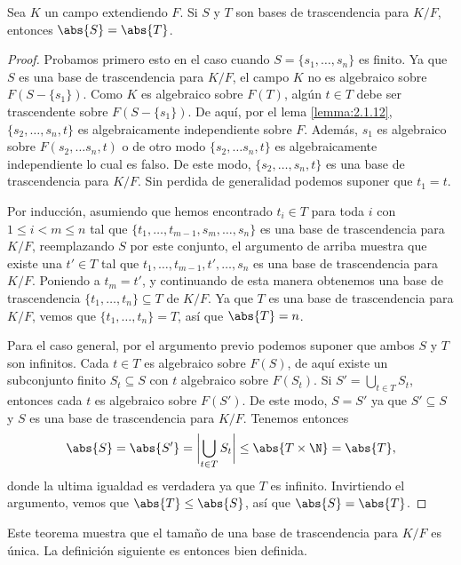 \begin{theorem}
  Sea $K$ un campo extendiendo $F$. Si $S$ y $T$ son bases de trascendencia para $K/F$, entonces $\abs{S} = \abs{T}$.
\end{theorem}
\begin{proof}
  Probamos primero esto en el caso cuando $S = \{s_1, \ldots, s_n\}$ es finito. Ya que $S$ es una base de trascendencia para $K/F$, el campo $K$ no es algebraico sobre $F(S - \{s_1\})$. Como $K$ es algebraico sobre $F(T)$, algún $t \in T$ debe ser trascendente sobre $F(S - \{s_1\})$. De aquí, por el lema \ref{lemma:2.1.12}, $\{s_2, \ldots, s_n, t\}$ es algebraicamente independiente sobre $F$. Además, $s_1$ es algebraico sobre $F(s_2,\ldots s_n, t)$ o de otro modo $\{s_2,\ldots s_n, t\}$ es algebraicamente independiente lo cual es falso. De este modo, $\{s_2, \ldots, s_n, t\}$ es una base de trascendencia para $K/F$. Sin perdida de generalidad podemos suponer que $t_1 = t$.

  Por inducción, asumiendo que hemos encontrado $t_i \in T$ para toda $i$ con $1 \leq i < m \leq n$ tal que $\{t_1, \ldots, t_{m-1}, s_m, \ldots, s_n\}$ es una base de trascendencia para $K/F$, reemplazando $S$ por este conjunto, el argumento de arriba muestra que existe una $t' \in T$ tal que $t_1, \ldots, t_{m-1}, t', \ldots, s_n$ es una base de trascendencia para $K/F$. Poniendo a $t_m = t'$, y continuando de esta manera obtenemos una base de trascendencia $\{t_1, \ldots, t_n\} \subseteq T $ de $K/F$. Ya que $T$ es una base de trascendencia para $K/F$, vemos que $\{t_1, \ldots, t_n\} = T $, así que $\abs{T} = n$.

  Para el caso general, por el argumento previo podemos suponer que ambos $S$ y $T$ son infinitos. Cada $t \in T$ es algebraico sobre $F(S)$, de aquí existe un subconjunto finito $S_t \subseteq S$ con $t$ algebraico sobre $F(S_t)$. Si $S' = \bigcup_{t\in T} S_t$, entonces cada $t$ es algebraico sobre $F(S')$. De este modo, $S = S'$ ya que $S' \subseteq S$ y $S$ es una base de trascendencia para $K/F$. Tenemos entonces
  \[
    \abs{S} = \abs{S'} = \biggl| \bigcup_{t \in T} S_t \biggr| \leq \abs{T \times \N} = \abs{T},
  \]
  donde la ultima igualdad es verdadera ya que $T$ es infinito. Invirtiendo el argumento, vemos que $\abs{T} \leq \abs{S}$, así que $\abs{S} = \abs{T}$.
\end{proof}

Este teorema muestra que el tamaño de una base de trascendencia para $K/F$ es única. La definición siguiente es entonces bien definida.